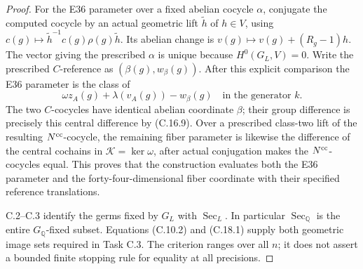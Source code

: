 \begin{proof}
For the E36 parameter over a fixed
abelian cocycle $\alpha$, conjugate
the computed cocycle by an actual
geometric lift $\widetilde h$ of
$h\in V$, using
$c(g)\mapsto\widetilde h^{-1}c(g)
                       \rho(g)\widetilde h$.
Its abelian change is
$v(g)\mapsto v(g)+(R_g-1)h$.
The vector giving the prescribed
$\alpha$ is unique because
$H^0(G_L,V)=0$.
Write the prescribed $C$-reference as
$(\beta(g),w_\beta(g))$.
After this explicit comparison the
E36 parameter is the class of
\[
       \omega z_A(g)+\lambda(v_A(g))-w_\beta(g)
             \quad\text{in the generator }k.              \tag{C.18.5}
\]
The two $C$-cocycles have identical
abelian coordinate $\beta$; their
group difference is precisely this
central difference by (C.16.9).
Over a prescribed class-two lift of
the resulting $N^{\rm cc}$-cocycle,
the remaining fiber parameter is
likewise the difference of the
central cochains in
$\mathcal K=\ker\omega$, after
actual conjugation makes the
$N^{\rm cc}$-cocycles equal.
This proves that the construction
evaluates both the E36 parameter
and the forty-four-dimensional
fiber coordinate with their
specified reference translations.

C.2--C.3 identify the germs fixed
by $G_L$ with $\operatorname{Sec}_L$.
In particular
$\operatorname{Sec}_{\mathbb Q}$
is the entire $G_{\mathbb Q}$-fixed
subset.  Equations (C.10.2) and
(C.18.1) supply both geometric
image sets required in Task C.3.
The criterion ranges over all $n$;
it does not assert a bounded
finite stopping rule for equality
at all precisions.
\end{proof}

